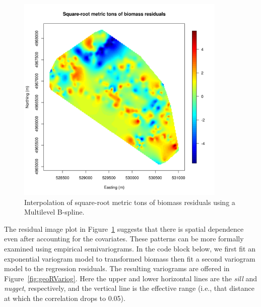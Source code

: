 \documentclass{article}
\begin{document}
\begin{figure}
\begin{center}
\includegraphics[width=10cm]{figures/fig-MBAResids}
\end{center}
\caption{Interpolation of square-root metric tons of biomass residuals using a Multilevel B-spline.}
\label{fig:MBAResids}
\end{figure}

The residual image plot in Figure~\ref{fig:MBAResids} suggests that there is spatial dependence even after accounting for the covariates. These patterns can be more formally examined using empirical semivariograms.  In the code block below, we first fit an exponential variogram model to transformed biomass then fit a second variogram model to the regression residuals. The resulting variograms are offered in Figure~\ref{fig:geoRVariog}. Here the upper and lower horizontal lines are the \emph{sill} and \emph{nugget}, respectively, and the vertical line is the effective range (i.e., that distance at which the correlation drops to 0.05).
\end{document}

